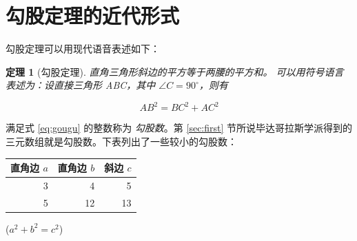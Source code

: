 \documentclass[UTF8]{ctexart} %
\begin{document}
\section{勾股定理的近代形式}

勾股定理可以用现代语音表述如下：

\newtheorem{thm}{定理}
\begin{thm}[勾股定理]
直角三角形斜边的平方等于两腰的平方和。
\newcommand{\degree}{^\circ}
可以用符号语言表述为：设直接三角形 ABC，其中 $\angle{C} =90 \degree$，则有
\end{thm}
\begin{equation}\label{eq:gougu}
  AB^2=BC^2+AC^2
\end{equation}

满足式 \eqref{eq:gougu} 的整数称为 \emph{勾股数}。第 \ref{sec:first} 节所说毕达哥拉斯学派得到的三元数组就是勾股数。下表列出了一些较小的勾股数：

\begin{table}[H]
  \begin{tabular}{|rrr|}
    \hline
    直角边 $a$ & 直角边 $b$ & 斜边 $c$ \\
    \hline
    3 & 4 & 5\\
    5 & 12 & 13\\
    \hline
  \end{tabular}
  \qquad
  ($a^2+b^2=c^2$)
\end{table}

\nocite{Shiye} %

 
\end{document}

